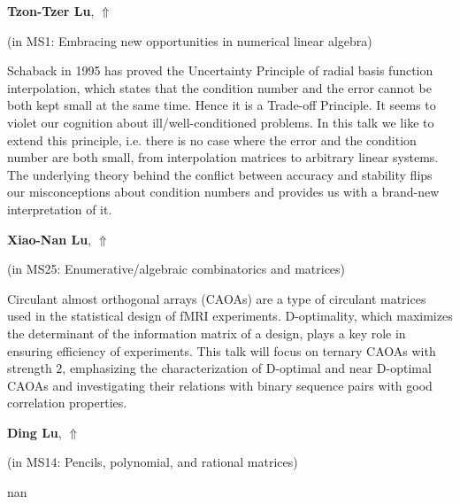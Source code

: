 \documentclass[ILAS2025-program.tex]{subfiles}
\begin{document}
     \hypertarget{down0348}{}\begin{ilasabstract}
    
    \textbf{Tzon-Tzer Lu},  \hfill \hyperlink{up0348}{$\Uparrow$}
    
    (in {\color{mstitle}MS1: Embracing new opportunities in numerical linear algebra})
        
        \mtskip
    Schaback in 1995 has proved the Uncertainty Principle of radial basis function interpolation, which states that the condition number and the error cannot be both kept small at the same time. Hence it is a Trade-off Principle. It seems to violet our cognition about ill/well-conditioned problems. In this talk we like to extend this principle, i.e. there is no case where the error and the condition number are both small, from interpolation matrices to arbitrary linear systems. The underlying theory behind the conflict between accuracy and stability flips our misconceptions about condition numbers and provides us with a brand-new interpretation of it. 
\end{ilasabstract}
     \hypertarget{down0368}{}\begin{ilasabstract}
    
    \textbf{Xiao-Nan Lu},  \hfill \hyperlink{up0368}{$\Uparrow$}
    
    (in {\color{mstitle}MS25: Enumerative/algebraic combinatorics and matrices})
        
        \mtskip
    Circulant almost orthogonal arrays (CAOAs) are a type of circulant matrices used in the statistical design of fMRI experiments. D-optimality, which maximizes the determinant of the information matrix of a design, plays a key role in ensuring efficiency of experiments.
This talk will focus on ternary CAOAs with strength $2$, emphasizing the characterization of D-optimal and near D-optimal CAOAs and investigating their relations with binary sequence pairs with good correlation properties.
\end{ilasabstract}
     \hypertarget{down0374}{}\begin{ilasabstract}
    
    \textbf{Ding Lu},  \hfill \hyperlink{up0374}{$\Uparrow$}
    
    (in {\color{mstitle}MS14: Pencils, polynomial, and rational matrices})
        
        \mtskip
    nan\end{ilasabstract}
\end{document}
